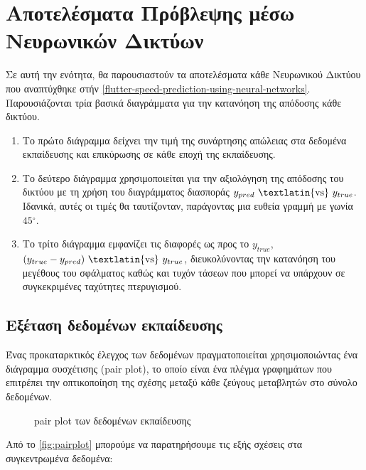 \section{Αποτελέσματα Πρόβλεψης μέσω Νευρωνικών Δικτύων}
\label{neural-network-prediction-results}

Σε αυτή την ενότητα, θα παρουσιαστούν τα αποτελέσματα κάθε Νευρωνικού Δικτύου που αναπτύχθηκε στήν \autoref{flutter-speed-prediction-using-neural-networks}. Παρουσιάζονται τρία βασικά διαγράμματα για την κατανόηση της απόδοσης κάθε δικτύου.

\begin{enumerate}
\def\labelenumi{\arabic{enumi}.}
\item
  Το πρώτο διάγραμμα δείχνει την τιμή της συνάρτησης απώλειας στα δεδομένα εκπαίδευσης και επικύρωσης σε κάθε εποχή της εκπαίδευσης.
\item
  Το δεύτερο διάγραμμα χρησιμοποιείται για την αξιολόγηση της απόδοσης του δικτύου με τη χρήση του διαγράμματος διασποράς \(y_{pred}\ \text{\textlatin{vs}} \ y_{true}\). Ιδανικά, αυτές οι τιμές θα ταυτίζονταν, παράγοντας μια ευθεία γραμμή με γωνία \(45{^\circ}\).
\item
  Το τρίτο διάγραμμα εμφανίζει τις διαφορές ως προς το \(y_{true}\),  \( (y_{true} - y_{pred})\ \text{\textlatin{vs}} \ y_{true} \), διευκολύνοντας την κατανόηση του μεγέθους του σφάλματος καθώς και τυχόν τάσεων που μπορεί να υπάρχουν σε συγκεκριμένες ταχύτητες πτερυγισμού.
\end{enumerate}

\subsection{Εξέταση δεδομένων εκπαίδευσης}
\label{training-data-examination}

Ένας προκαταρκτικός έλεγχος των δεδομένων πραγματοποιείται χρησιμοποιώντας ένα διάγραμμα συσχέτισης \textlatin{(pair plot)}, το οποίο είναι ένα πλέγμα γραφημάτων που επιτρέπει την οπτικοποίηση της σχέσης μεταξύ κάθε ζεύγους μεταβλητών στο σύνολο δεδομένων.


\begin{figure}[H]
    \centering
    
    \caption{\textlatin{pair plot} των δεδομένων εκπαίδευσης}
    \label{fig:pairplot}
\end{figure}

Από το \autoref{fig:pairplot} μπορούμε να παρατηρήσουμε τις εξής σχέσεις στα συγκεντρωμένα δεδομένα:


